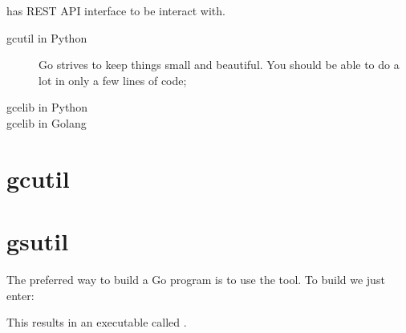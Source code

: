 

\noindent{}  has REST API interface to be interact with.

\begin{description}
\item[gcutil in Python]
Go strives to keep things small and beautiful. You should
be able to do a lot in only a few lines of code;  
\item[gcelib in Python ]
\item[gcelib in Golang] 

\end{description}

\section{gcutil}
\label{sec:gcutil}

\section{gsutil}
\label{sec:gsutil}
The preferred way to build a Go program is to use the  tool.
To build  we just enter:
\begin{display}
\pr {}
\end{display}
This results in an executable called .

